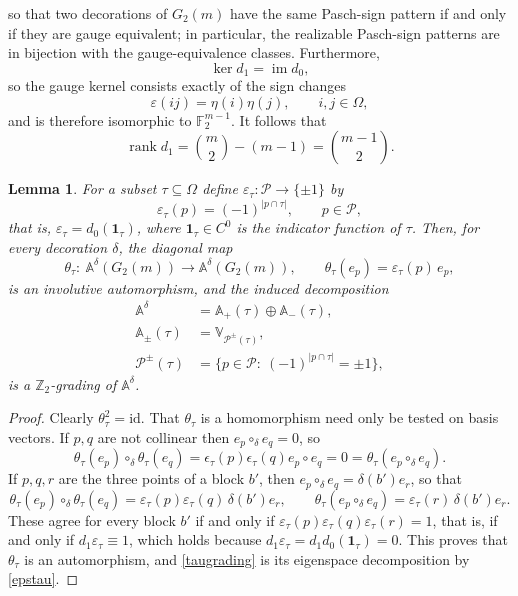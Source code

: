\documentclass[10pt,a4paper]{amsart}
\newtheorem{lemma}[theorem]{Lemma}
\numberwithin{equation}{section}
\def\alg{\mathbb{A}}
\def\valg{\mathbb{V}}
\begin{document}
so that two decorations of $G_2(m)$ have the same Pasch-sign pattern if
and only if they are gauge equivalent; in particular, the realizable
Pasch-sign patterns are in bijection with the gauge-equivalence classes.
Furthermore,
$$
\ker d_1=\operatorname{im}d_0,
$$
so the gauge kernel consists exactly of the sign changes
$$
\varepsilon(ij)=\eta(i)\eta(j),
\qquad
i,j\in\Omega,
$$
and is therefore isomorphic to $\mathbb F_2^{m-1}$. It follows that
\begin{equation}\label{rankd1}
\operatorname{rank}d_1
=
\binom{m}{2}-(m-1)
=
\binom{m-1}{2}.
\end{equation}



\begin{lemma}\label{lem:gradingauto}
For a subset $\tau\subseteq\Omega$ define
$\varepsilon_\tau:\mathcal P\to\{\pm1\}$ by
\begin{equation}\label{epstau}
\varepsilon_\tau(p)=(-1)^{|p\cap\tau|},
\qquad
p\in\mathcal P,
\end{equation}
that is, $\varepsilon_\tau=d_0(\mathbf 1_\tau)$, where
$\mathbf 1_\tau\in C^0$ is the indicator function of $\tau$. Then, for
\emph{every} decoration $\delta$, the diagonal map
\begin{equation}\label{thetatau}
\theta_\tau:\ \alg^\delta(G_2(m))\to\alg^\delta(G_2(m)),
\qquad
\theta_\tau(e_p)=\varepsilon_\tau(p)\,e_p ,
\end{equation}
is an involutive automorphism, and the induced decomposition
\begin{equation}\label{taugrading}
\begin{aligned}
\alg^\delta&=\alg_{+}(\tau)\oplus\alg_{-}(\tau),\\
\alg_{\pm}(\tau)&=\valg_{\mathcal P^{\pm}(\tau)},\\
\mathcal P^{\pm}(\tau)&=\{p\in\mathcal P:\ (-1)^{|p\cap\tau|}=\pm1\},
\end{aligned}
\end{equation}
is a $\mathbb Z_2$-grading of $\alg^\delta$.
\end{lemma}

\begin{proof}
Clearly $\theta_\tau^2=\mathrm{id}$. That $\theta_{\tau}$ is a homomorphism need only be tested
on basis vectors. If $p,q$ are not collinear then
$e_p\circ_\delta e_q=0$, so
$$\theta_\tau(e_p)\circ_\delta\theta_\tau(e_q)
= \epsilon_{\tau}(p)\epsilon_{\tau}(q)e_{p}\circ e_{q} = 0 = \theta_{\tau}(e_{p}\circ_{\delta}e_{q}).$$
If $p,q,r$ are the three points of a block $b'$,
then $e_p\circ_\delta e_q=\delta(b')e_r$, so that
$$
\theta_\tau(e_p)\circ_\delta\theta_\tau(e_q)
=\varepsilon_\tau(p)\varepsilon_\tau(q)\,\delta(b')e_r,
\qquad
\theta_\tau(e_p\circ_\delta e_q)=\varepsilon_\tau(r)\,\delta(b')e_r .
$$
These agree for every block $b'$ if and only if
$\varepsilon_\tau(p)\varepsilon_\tau(q)\varepsilon_\tau(r)=1$, that is,
if and only if $d_1\varepsilon_\tau\equiv1$, which holds because
$d_1\varepsilon_\tau=d_1d_0(\mathbf 1_\tau)=0$. This proves that
$\theta_\tau$ is an automorphism, and \eqref{taugrading} is its
eigenspace decomposition by \eqref{epstau}.
\end{proof}
\end{document}
